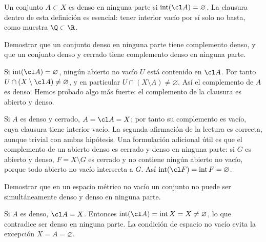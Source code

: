 \begin{definicion}
Un conjunto $A\subset X$ es denso en ninguna parte si $\operatorname{int}(\cl A)=\varnothing$. La clausura dentro de esta definición es esencial: tener interior vacío por sí solo no basta, como muestra $\Q\subset\R$.
\end{definicion}

\begin{ejercicio}
Demostrar que un conjunto denso en ninguna parte tiene complemento denso, y que un conjunto denso y cerrado tiene complemento denso en ninguna parte.
\end{ejercicio}
\begin{solucion}
Si $\operatorname{int}(\cl A)=\varnothing$, ningún abierto no vacío $U$ está contenido en $\cl A$. Por tanto $U\cap(X\setminus\cl A)\ne\varnothing$, y en particular $U\cap(X\setminus A)\ne\varnothing$. Así el complemento de $A$ es denso. Hemos probado algo más fuerte: el complemento de la clausura es abierto y denso.

Si $A$ es denso y cerrado, $A=\cl A=X$; por tanto su complemento es vacío, cuya clausura tiene interior vacío. La segunda afirmación de la lectura es correcta, aunque trivial con ambas hipótesis. Una formulación adicional útil es que el complemento de un abierto denso es cerrado y denso en ninguna parte: si $G$ es abierto y denso, $F=X\setminus G$ es cerrado y no contiene ningún abierto no vacío, porque todo abierto no vacío intersecta a $G$. Así $\operatorname{int}(\cl F)=\operatorname{int}F=\varnothing$.
\end{solucion}

\begin{ejercicio}
Demostrar que en un espacio métrico no vacío un conjunto no puede ser simultáneamente denso y denso en ninguna parte.
\end{ejercicio}
\begin{solucion}
Si $A$ es denso, $\cl A=X$. Entonces $\operatorname{int}(\cl A)=\operatorname{int}X=X\ne\varnothing$, lo que contradice ser denso en ninguna parte. La condición de espacio no vacío evita la excepción $X=A=\varnothing$.
\end{solucion}

